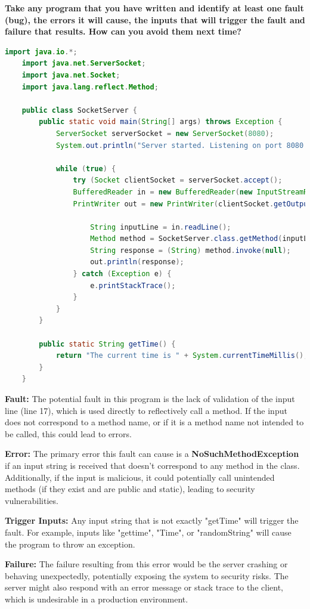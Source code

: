 \documentclass[12pt]{article}
\numberwithin{table}{section}
\begin{document}
\textbf{Take any program that you have written and identify at least one fault (bug), the errors it will cause, the inputs that will trigger the fault and failure that results. How can you avoid them next time?}

\begin{lstlisting}[language=Java]
	import java.io.*;
	import java.net.ServerSocket;
	import java.net.Socket;
	import java.lang.reflect.Method;
	
	public class SocketServer {
		public static void main(String[] args) throws Exception {
			ServerSocket serverSocket = new ServerSocket(8080);
			System.out.println("Server started. Listening on port 8080...");
			
			while (true) {
				try (Socket clientSocket = serverSocket.accept();
				BufferedReader in = new BufferedReader(new InputStreamReader(clientSocket.getInputStream()));
				PrintWriter out = new PrintWriter(clientSocket.getOutputStream(), true);) {
					
					String inputLine = in.readLine();
					Method method = SocketServer.class.getMethod(inputLine);
					String response = (String) method.invoke(null);
					out.println(response);
				} catch (Exception e) {
					e.printStackTrace();
				}
			}
		}
		
		public static String getTime() {
			return "The current time is " + System.currentTimeMillis();
		}
	}
\end{lstlisting} 

\textbf{Fault:} The potential fault in this program is the lack of validation of the input line (line 17), which is used directly to reflectively call a method. If the input does not correspond to a method name, or if it is a method name not intended to be called, this could lead to errors.

\textbf{Error:} The primary error this fault can cause is a \textbf{NoSuchMethodException} if an input string is received that doesn't correspond to any method in the class. Additionally, if the input is malicious, it could potentially call unintended methods (if they exist and are public and static), leading to security vulnerabilities.

\textbf{Trigger Inputs:} Any input string that is not exactly "getTime" will trigger the fault. For example, inputs like "gettime", "Time", or "randomString" will cause the program to throw an exception.

\textbf{Failure: }The failure resulting from this error would be the server crashing or behaving unexpectedly, potentially exposing the system to security risks. The server might also respond with an error message or stack trace to the client, which is undesirable in a production environment.\\
\end{document}
